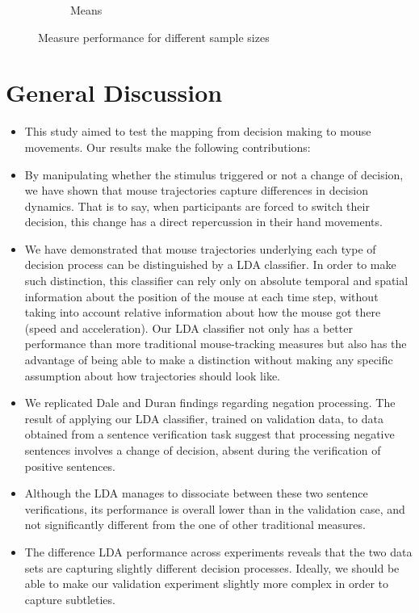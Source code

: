 \documentclass{article}
\begin{document}
\begin{itemize}
\begin{figure}
\begin{subfigure}[b]{0.5\textwidth}
\caption{Means}\label{fig:means}
\end{subfigure}
\caption{Measure performance for different sample sizes}\label{fig:AUC.negation} 
\end{figure}



\end{itemize}


\section{General Discussion}


\begin{itemize}
\item This study aimed to test the mapping from decision making to mouse movements. Our results make the following contributions:

\item By manipulating whether the stimulus triggered or not a change of decision, we have shown that mouse trajectories capture differences in decision dynamics. 
That is to say, when participants are forced to switch their decision, this change has a direct repercussion in their hand movements.  

\item We have demonstrated that mouse trajectories underlying each type of decision process can be distinguished by a LDA classifier. In order to make such distinction, this classifier can rely only on absolute temporal and spatial information about the position of the mouse at each time step, without taking into account relative information about how the mouse got there (speed and acceleration).
Our LDA classifier not only has a better performance than more traditional mouse-tracking measures but also has the advantage of being able to make a distinction without making any specific assumption about how trajectories should look like.     

\item We replicated Dale and Duran findings regarding negation processing. The result of applying our LDA classifier, trained on validation data, to data obtained from a sentence verification task suggest that processing negative sentences involves a change of decision, absent during the verification of positive sentences. 

\item Although the LDA manages to dissociate between these two sentence verifications, its performance is overall lower than in the validation case, and not significantly different from the one of other traditional measures. 

\item The difference LDA performance across experiments reveals that the two data sets 
are capturing slightly different decision processes. Ideally, we should be able to make our validation experiment slightly more complex in order to capture subtleties.  


\end{itemize}
\end{document}
